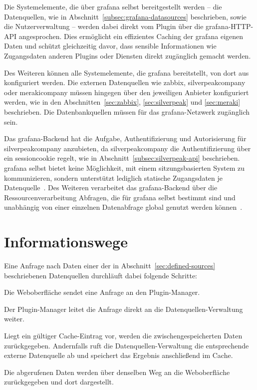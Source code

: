 Die Systemelemente, die über \gls{grafana} selbst bereitgestellt werden – die
Datenquellen, wie in Abschnitt~\ref{subsec:grafana-datasources} beschrieben, sowie die
Nutzerverwaltung – werden dabei direkt vom Plugin über die \gls{grafana}-HTTP-API
angesprochen. Dies ermöglicht ein effizientes Caching der \gls{grafana} eigenen Daten und schützt
gleichzeitig davor, dass sensible Informationen wie Zugangsdaten anderen Plugins oder
Diensten direkt zugänglich gemacht werden.

Des Weiteren können alle Systemelemente, die \gls{grafana} bereitstellt, von dort aus
konfiguriert werden. Die externen Datenquellen wie \gls{zabbix}, \gls{silverpeakcompany}
oder \gls{merakicompany} müssen hingegen über den jeweiligen Anbieter konfiguriert werden,
wie in den Abschnitten~\ref{sec:zabbix}, \ref{sec:silverpeak} und \ref{sec:meraki}
beschrieben. Die Datenbankquellen müssen für das \gls{grafana}-Netzwerk zugänglich sein.

Das \gls{grafana}-Backend hat die Aufgabe, Authentifizierung und Autorisierung für
\gls{silverpeakcompany} anzubieten, da \gls{silverpeakcompany} die Authentifizierung über
ein \gls{sessioncookie} regelt, wie in Abschnitt~\ref{subsec:silverpeak-api} beschrieben.
\gls{grafana} selbst bietet keine Möglichkeit, mit einem sitzungsbasierten System zu
kommunizieren, sondern unterstützt lediglich statische Zugangsdaten je
Datenquelle~\cite{grafana2026datasources}. Des Weiteren verarbeitet das
\gls{grafana}-Backend über die Ressourcenverarbeitung Abfragen, die für \gls{grafana}
selbst bestimmt sind und unabhängig von einer einzelnen Datenabfrage global genutzt werden
können~\cite{grafana2026backendplugins}. 

\section{Informationswege}
\label{sec:info-ways}

Eine Anfrage nach Daten einer der in Abschnitt~\ref{sec:defined-sources} beschriebenen
Datenquellen durchläuft dabei folgende Schritte:

\begin{compactenum}
    \item Die Weboberfläche sendet eine Anfrage an den Plugin-Manager.

    \item Der Plugin-Manager leitet die Anfrage direkt an die Datenquellen-Verwaltung
    weiter.

    \item Liegt ein gültiger Cache-Eintrag vor, werden die zwischengespeicherten Daten
    zurückgegeben. Andernfalls ruft die Datenquellen-Verwaltung die entsprechende externe
    Datenquelle ab und speichert das Ergebnis anschließend im Cache.

    \item Die abgerufenen Daten werden über denselben Weg an die Weboberfläche
    zurückgegeben und dort dargestellt.
\end{compactenum}

